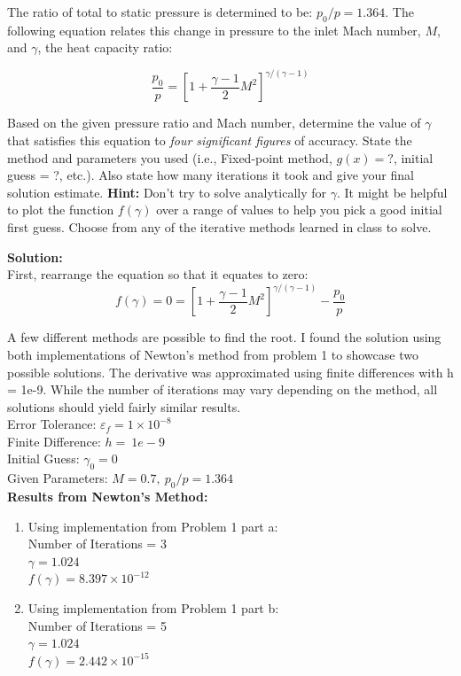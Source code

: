 \documentclass[12pt]{article}
\begin{document}
\begin{description}
The ratio of total to static pressure is determined to be: $p_0/p = 1.364$. The following equation relates this change in pressure to the inlet Mach number, $M$, and $\gamma$, the heat capacity ratio:

\begin{equation*}
\dfrac{p_0}{p}= \left[ 1 + \dfrac{\gamma-1}{2}M^2 \right]^{\gamma/(\gamma-1)}
\end{equation*}

Based on the given pressure ratio and Mach number, determine the value of $\gamma$ that satisfies this equation to \emph{four significant figures} of accuracy. State the method and parameters you used (i.e., Fixed-point method, $g(x) = ?$, initial guess = ?, etc.). Also state how many iterations it took and give your final solution estimate. \textbf{Hint:} Don't try to solve analytically for $\gamma$. It might be helpful to plot the function $f(\gamma)$ over a range of values to help you pick a good initial first guess. Choose from any of the iterative methods learned in class to solve.

\ifsolution
\color{red}
\textbf{Solution:} \\
First, rearrange the equation so that it equates to zero:
\begin{equation*}
f(\gamma) = 0 = \left[ 1 + \dfrac{\gamma-1}{2}M^2 \right]^{\gamma/(\gamma-1)} - \dfrac{p_0}{p}
\end{equation*}

A few different methods are possible to find the root. I found the solution using both implementations of Newton's method from problem 1 to showcase two possible solutions. The derivative was approximated using finite differences with h = 1e-9. While the number of iterations may vary depending on the method, all solutions should yield fairly similar results. \\


Error Tolerance: $\varepsilon_{f} = 1 \times 10^{-8}$ \\
Finite Difference: $h=~1e-9$ \\
Initial Guess: $\gamma_{0} = 0$ \\
Given Parameters: $M = 0.7, \ p_0/p = 1.364$ \\

\textbf{Results from Newton's Method:}
\begin{enumerate}[label=\textbf{(\alph*)}]
    \item Using implementation from Problem 1 part a: \\
    Number of Iterations = 3 \\
    $\gamma = 1.024$ \\
    $f(\gamma) = 8.397 \times 10^{-12}$ \\

    \item Using implementation from Problem 1 part b: \\
    Number of Iterations = 5 \\
    $\gamma = 1.024$ \\
    $f(\gamma) = 2.442 \times 10^{-15}$
\end{enumerate}
\color{black}
\fi

\end{description}
\end{document}
